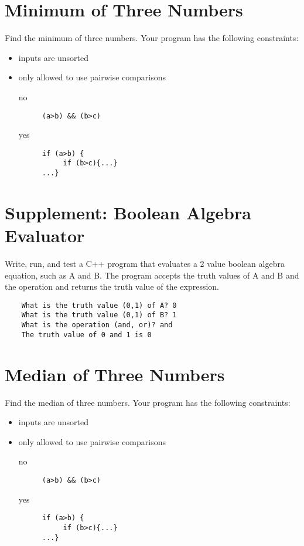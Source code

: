 \documentclass{article}
\begin{document}
\section*{Minimum of Three Numbers}
Find the minimum of three numbers. Your program has the following constraints:
\begin{itemize}
	\item inputs are unsorted
	\item only allowed to use pairwise comparisons
		\begin{description}
			\item [no] 
\begin{verbatim}
(a>b) && (b>c)
\end{verbatim}
\item[yes] 
\begin{verbatim} 
if (a>b) { 
     if (b>c){...}
...}
\end{verbatim}
\end{description} 
\end{itemize}


\section*{Supplement: Boolean Algebra Evaluator}
Write, run, and test a C++ program that evaluates a 2 value boolean algebra equation, such as A and B.  The program accepts the truth values of A and B and the operation and returns the truth value of the expression. 
\begin{verbatim}
	What is the truth value (0,1) of A? 0
	What is the truth value (0,1) of B? 1
	What is the operation (and, or)? and
	The truth value of 0 and 1 is 0
\end{verbatim}

\section*{Median of Three Numbers}
Find the median of three numbers. Your program has the following constraints:
\begin{itemize}
	\item inputs are unsorted
	\item only allowed to use pairwise comparisons
		\begin{description}
			\item [no] 
\begin{verbatim}
(a>b) && (b>c)
\end{verbatim}
\item[yes] 
\begin{verbatim} 
if (a>b) { 
     if (b>c){...}
...}
\end{verbatim}
\end{description} 
\end{itemize}
\end{document}
